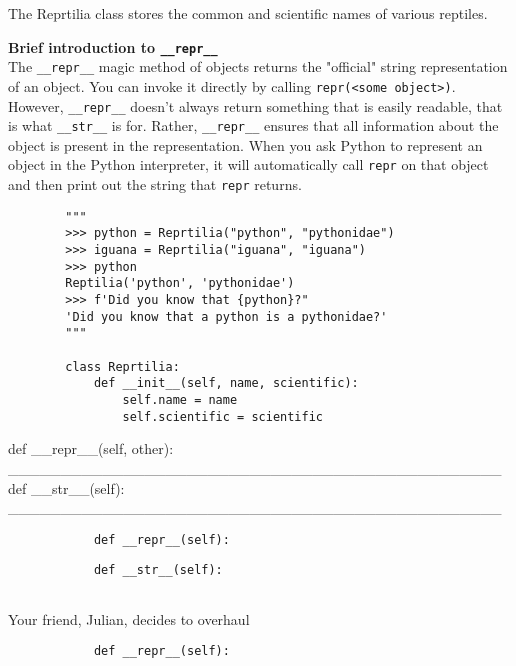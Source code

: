 \begin{blocksection}
    \question The Reprtilia class stores the common and scientific names of various reptiles.
    
    \textbf{Brief introduction to \lstinline{__repr__}} \\ The \lstinline{__repr__} magic method of objects returns the "official" string representation of an object. You can invoke it directly by calling \lstinline{repr(<some object>)}. However, \lstinline{__repr__} doesn't always return something that is easily readable, that is what \lstinline{__str__} is for. Rather, \lstinline{__repr__} ensures that all information about the object is present in the representation. When you ask Python to represent an object in the Python interpreter, it will automatically call \lstinline{repr} on that object and then print out the string that \lstinline{repr} returns.
    
    \vspace{1.5\baselineskip}
    
    \begin{lstlisting}
        """
        >>> python = Reprtilia("python", "pythonidae")
        >>> iguana = Reprtilia("iguana", "iguana")
        >>> python
        Reptilia('python', 'pythonidae')
        >>> f'Did you know that {python}?"
        'Did you know that a python is a pythonidae?'
        """
    
        class Reprtilia:
            def __init__(self, name, scientific):
                self.name = name
                self.scientific = scientific
    \end{lstlisting}
            def __repr__(self, other):
                _______________________________________________
            def __str__(self):
                _______________________________________________
\end{blocksection}
    
\begin{blocksection}
    \begin{lstlisting}
            def __repr__(self):

    \end{lstlisting}
\end{blocksection}

\begin{blocksection}
    \begin{lstlisting}
            def __str__(self):
                
    \end{lstlisting}
\end{blocksection}

\begin{blocksection}
    \question Your friend, Julian, decides to overhaul 
    \begin{lstlisting}
            def __repr__(self):
                
    \end{lstlisting}
\end{blocksection}    
    